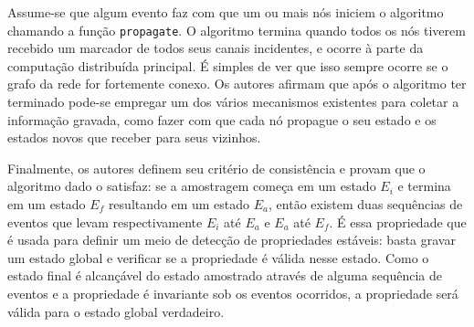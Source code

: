Assume-se que algum evento faz com que um ou mais nós iniciem o
algoritmo chamando a função \texttt{propagate}. O algoritmo termina
quando todos os nós tiverem recebido um marcador de todos seus canais
incidentes, e ocorre à parte da computação distribuída principal. É
simples de ver que isso sempre ocorre se o grafo da rede for
fortemente conexo. Os autores afirmam que após o algoritmo ter
terminado pode-se empregar um dos vários mecanismos existentes para
coletar a informação gravada, como fazer com que cada nó propague o
seu estado e os estados novos que receber para seus vizinhos.

Finalmente, os autores definem seu critério de consistência e provam
que o algoritmo dado o satisfaz: se a amostragem começa em um estado
$E_i$ e termina em um estado $E_f$ resultando em um estado $E_a$,
então existem duas sequências de eventos que levam respectivamente
$E_i$ até $E_a$ e $E_a$ até $E_f$. É essa propriedade que é usada para
definir um meio de detecção de propriedades estáveis: basta gravar um
estado global e verificar se a propriedade é válida nesse estado. Como
o estado final é alcançável do estado amostrado através de alguma
sequência de eventos e a propriedade é invariante sob os eventos
ocorridos, a propriedade será válida para o estado global verdadeiro.
